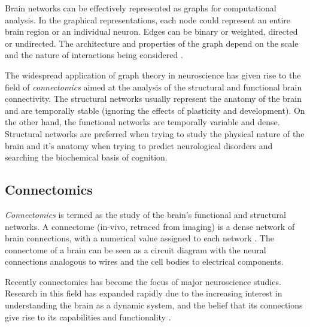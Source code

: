 \documentclass[msthesis.tex]{subfiles}
\begin{document}
Brain networks can be effectively represented as graphs for computational analysis. In the graphical representations, each node could represent an entire brain region or an individual neuron. Edges can be binary or weighted, directed or undirected. The architecture and properties of the graph depend on the scale and the nature of interactions being considered \citep{rubinov2010complex}. 

The widespread application of graph theory in neuroscience has given rise to the field of \textit{connectomics} \citep{sporns2005human} aimed at the analysis of the structural and functional brain connectivity. The structural networks usually represent the anatomy of the brain and are temporally stable (ignoring the effects of plasticity and development). On the other hand, the functional networks are temporally variable and dense. Structural networks are preferred when trying to study the physical nature of the brain and it's anatomy when trying to predict neurological disorders and searching the biochemical basis of cognition.

\subsection{Connectomics}
\label{sec:connectomics}
\textit{Connectomics} is termed as the study of the brain's functional and structural networks. A connectome (in-vivo, retraced from imaging) is a dense network of brain connections, with a numerical value assigned to each network \citep{bassett2017network}. The connectome of a brain can be seen as a circuit diagram with the neural connections analogous to wires and the cell bodies to electrical components.

Recently connectomics has become the focus of major neuroscience studies. Research in this field has expanded rapidly due to the increasing interest in understanding the brain as a dynamic system, and the belief that its connections give rise to its capabilities and functionality \citep{network_neuroscience_editorial}.
\end{document}
